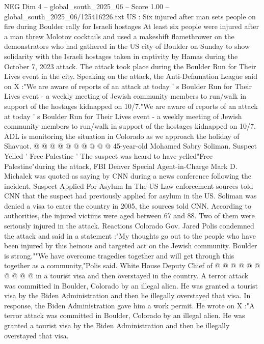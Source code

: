 \begin{textsample}{NEG Dim 4 – global\_south\_2025\_06 – Score 1.00 – global\_south\_2025\_06/125416226.txt}  \label{ex:f4_neg_110}
US : Six injured after man sets people on fire during Boulder rally for Israeli hostages At least six people were injured after a man threw Molotov cocktails and used a makeshift flamethrower on the demonstrators who had gathered in the US city of Boulder on Sunday to show solidarity with the Israeli hostages taken in captivity by Hamas during the October 7, 2023 attack.
The attack took place during the Boulder Run for Their Lives event in the city.
Speaking on the attack, the Anti-Defamation League said on X :"We are aware of reports of an attack at today ' s Boulder Run for Their Lives event - a weekly meeting of Jewish community members to run/walk in support of the hostages kidnapped on 10/7."We are aware of reports of an attack at today ' s Boulder Run for Their Lives event - a weekly meeting of Jewish community members to run/walk in support of the hostages kidnapped on 10/7.
ADL is monitoring the situation in Colorado as we approach the holiday of Shavuot. @ @ @ @ @ @ @ @ @ @ 45-year-old Mohamed Sabry Soliman.
Suspect Yelled ' Free Palestine ' The suspect was heard to have yelled"Free Palestine"during the attack, FBI Denver Special Agent-in-Charge Mark D.
Michalek was quoted as saying by CNN during a news conference following the incident.
Suspect Applied For Asylum In The US Law enforcement sources told CNN that the suspect had previously applied for asylum in the US.
Soliman was denied a visa to enter the country in 2005, the sources told CNN.
According to authorities, the injured victims were aged between 67 and 88.
Two of them were seriously injured in the attack.
Reactions Colorado Gov.
Jared Polis condemned the attack and said in a statement :"My thoughts go out to the people who have been injured by this heinous and targeted act on the Jewish community.
Boulder is strong.""We have overcome tragedies together and will get through this together as a community,"Polis said.
White House Deputy Chief of @ @ @ @ @ @ @ @ @ @ in a tourist visa and then overstayed in the country.
A terror attack was committed in Boulder, Colorado by an illegal alien.
He was granted a tourist visa by the Biden Administration and then he illegally overstayed that visa.
In response, the Biden Administration gave him a work permit.
He wrote on X :"A terror attack was committed in Boulder, Colorado by an illegal alien.
He was granted a tourist visa by the Biden Administration and then he illegally overstayed that visa.

\end{textsample}
